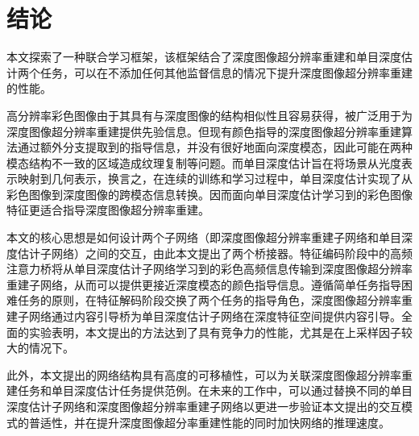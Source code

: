 \chapter{结论}

本文探索了一种联合学习框架，该框架结合了深度图像超分辨率重建和单目深度估计两个任务，可以在不添加任何其他监督信息的情况下提升深度图像超分辨率重建的性能。

高分辨率彩色图像由于其具有与深度图像的结构相似性且容易获得，被广泛用于为深度图像超分辨率重建提供先验信息。但现有颜色指导的深度图像超分辨率重建算法通过额外分支提取到的指导信息，并没有很好地面向深度模态，因此可能在两种模态结构不一致的区域造成纹理复制等问题。而单目深度估计旨在将场景从光度表示映射到几何表示，换言之，在连续的训练和学习过程中，单目深度估计实现了从彩色图像到深度图像的跨模态信息转换。因而面向单目深度估计学习到的彩色图像特征更适合指导深度图像超分辨率重建。

本文的核心思想是如何设计两个子网络（即深度图像超分辨率重建子网络和单目深度估计子网络）之间的交互，由此本文提出了两个桥接器。特征编码阶段中的高频注意力桥将从单目深度估计子网络学习到的彩色高频信息传输到深度图像超分辨率重建子网络，从而可以提供更接近深度模态的颜色指导信息。遵循简单任务指导困难任务的原则，在特征解码阶段交换了两个任务的指导角色，深度图像超分辨率重建子网络通过内容引导桥为单目深度估计子网络在深度特征空间提供内容引导。全面的实验表明，本文提出的方法达到了具有竞争力的性能，尤其是在上采样因子较大的情况下。

此外，本文提出的网络结构具有高度的可移植性，可以为关联深度图像超分辨率重建任务和单目深度估计任务提供范例。在未来的工作中，可以通过替换不同的单目深度估计子网络和深度图像超分辨率重建子网络以更进一步验证本文提出的交互模式的普适性，并在提升深度图像超分率重建性能的同时加快网络的推理速度。
